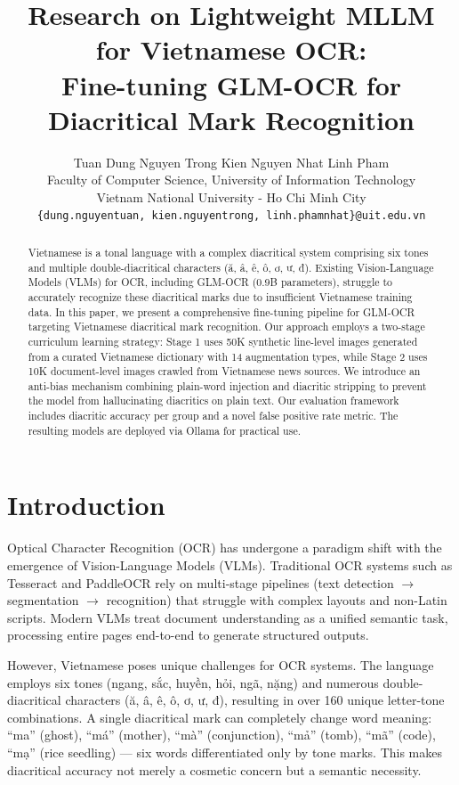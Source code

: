 \documentclass[11pt]{article}
\title{Research on Lightweight MLLM for Vietnamese OCR:\\
Fine-tuning GLM-OCR for Diacritical Mark Recognition}
\author{
  Tuan Dung Nguyen \quad Trong Kien Nguyen \quad Nhat Linh Pham \\
  Faculty of Computer Science, University of Information Technology \\
  Vietnam National University - Ho Chi Minh City \\
  \texttt{\{dung.nguyentuan, kien.nguyentrong, linh.phamnhat\}@uit.edu.vn}
}
\date{}
\begin{document}
\maketitle

\begin{abstract}
Vietnamese is a tonal language with a complex diacritical system comprising six tones and multiple double-diacritical characters (ă, â, ê, ô, ơ, ư, đ). 
Existing Vision-Language Models (VLMs) for OCR, including GLM-OCR (0.9B parameters), struggle to accurately recognize these diacritical marks due to insufficient Vietnamese training data. 
In this paper, we present a comprehensive fine-tuning pipeline for GLM-OCR targeting Vietnamese diacritical mark recognition. 
Our approach employs a two-stage curriculum learning strategy: Stage 1 uses 50K synthetic line-level images generated from a curated Vietnamese dictionary with 14 augmentation types, while Stage 2 uses 10K document-level images crawled from Vietnamese news sources. 
We introduce an anti-bias mechanism combining plain-word injection and diacritic stripping to prevent the model from hallucinating diacritics on plain text. 
Our evaluation framework includes diacritic accuracy per group and a novel false positive rate metric. 
The resulting models are deployed via Ollama for practical use.
\end{abstract}

\section{Introduction}

Optical Character Recognition (OCR) has undergone a paradigm shift with the emergence of Vision-Language Models (VLMs). 
Traditional OCR systems such as Tesseract \cite{smith2007ocr} and PaddleOCR \cite{paddleocr2022} rely on multi-stage pipelines (text detection $\rightarrow$ segmentation $\rightarrow$ recognition) that struggle with complex layouts and non-Latin scripts. 
Modern VLMs treat document understanding as a unified semantic task, processing entire pages end-to-end to generate structured outputs.

However, Vietnamese poses unique challenges for OCR systems. 
The language employs six tones (ngang, sắc, huyền, hỏi, ngã, nặng) and numerous double-diacritical characters (ă, â, ê, ô, ơ, ư, đ), resulting in over 160 unique letter-tone combinations. 
A single diacritical mark can completely change word meaning: ``ma'' (ghost), ``má'' (mother), ``mà'' (conjunction), ``mả'' (tomb), ``mã'' (code), ``mạ'' (rice seedling) --- six words differentiated only by tone marks. 
This makes diacritical accuracy not merely a cosmetic concern but a semantic necessity.
\end{document}

